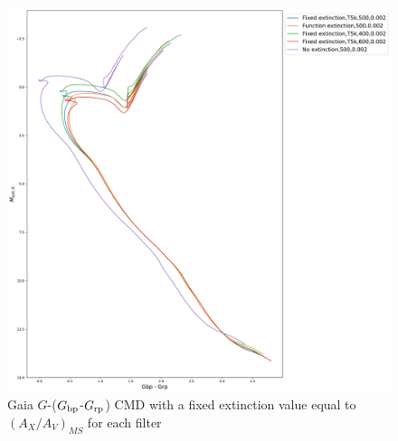 \documentclass[12pt, a4paper]{report}
\begin{document}
\begin{figure}[h!]
\begin{center}
\includegraphics[width=1.0\textwidth]{../basti_isochrones_10_13Gyr/Extinction_T5k_FeH0fix_func_G_GbpmGrp_500_400_600_Myr_FeH_0p002_ref_noext_Av_1p0.pdf}
\caption{Gaia $G$-($G_{\textnormal{bp}}$-$G_{\textnormal{rp}}$) CMD with a fixed extinction value equal to $(A_{X}/A_{V})_{MS}$ for each filter}
\label{gaia_isoc_T5k}
\end{center}
\end{figure}
\end{document}
